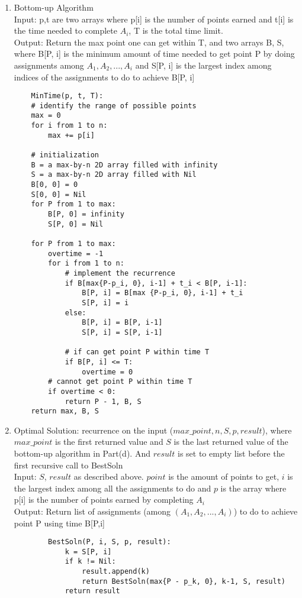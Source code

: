 \documentclass[11pt]{article}
\begin{document}
\begin{enumerate}
\begin{enumerate}
\begin{proof}
                We thus complete the proof for the claim.
            \end{proof}
        \item Bottom-up Algorithm\\
        Input: p,t are two arrays where p[i] is the number of points earned and  t[i] is the time needed to complete $A_i$, T is the total time limit.\\
        Output: Return the max point one can get within T, and two arrays B, S, where B[P, i] is the minimum amount of time needed to get point P by doing assignments among $A_1, A_2, ..., A_i$ and S[P, i] is the largest index among indices of the assignments to do to achieve B[P, i]\\
            \begin{lstlisting}
    MinTime(p, t, T):
    # identify the range of possible points
    max = 0
    for i from 1 to n:
        max += p[i]
        
    # initialization
    B = a max-by-n 2D array filled with infinity
    S = a max-by-n 2D array filled with Nil
    B[0, 0] = 0
    S[0, 0] = Nil
    for P from 1 to max:
        B[P, 0] = infinity
        S[P, 0] = Nil
    
    for P from 1 to max:
        overtime = -1
        for i from 1 to n:
            # implement the recurrence
            if B[max{P-p_i, 0}, i-1] + t_i < B[P, i-1]:
                B[P, i] = B[max {P-p_i, 0}, i-1] + t_i
                S[P, i] = i
            else:
                B[P, i] = B[P, i-1]
                S[P, i] = S[P, i-1]
            
            # if can get point P within time T
            if B[P, i] <= T:
                overtime = 0
        # cannot get point P within time T 
        if overtime < 0:
            return P - 1, B, S
    return max, B, S
    \end{lstlisting}
    
        \item Optimal Solution: recurrence on the input ($max\_point, n, S, p, result$), where $max\_point$ is the first returned value and $S$ is the last returned value of the bottom-up algorithm in Part(d). And $result$ is set to empty list before the first recursive call to BestSoln\\[2ex]
        Input: $S$, $result$ as described above. $point$ is the amount of points to get, $i$ is the largest index among all the assignments to do and $p$ is the array where p[i] is the number of points earned by completing $A_i$\\
        Output: Return list of assignments (among $(A_1, A_2, ..., A_i)$) to do to achieve point P using time B[P,i]
        \begin{lstlisting}
        BestSoln(P, i, S, p, result):
            k = S[P, i]
            if k != Nil:
                result.append(k)
                return BestSoln(max{P - p_k, 0}, k-1, S, result)
            return result
        \end{lstlisting}
        

\end{enumerate}
\end{enumerate}
\end{document}
